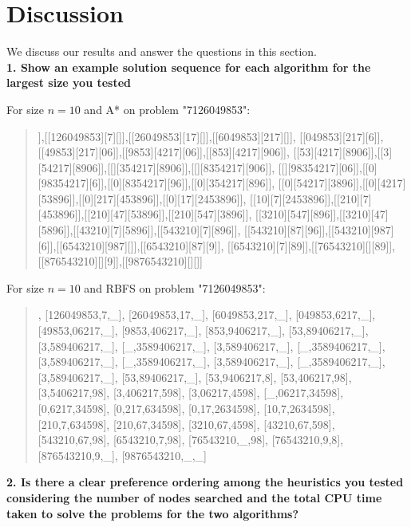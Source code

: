 \section{Discussion}

We discuss our results and answer the questions in this section.\\

\textbf{1. Show an example solution sequence for each algorithm for the largest size you tested}

For size $n = 10$ and A* on problem "7126049853":

\begin{quote}
\noindent
[[7126049853][][]],[[126049853][7][]],[[26049853][17][]],[[6049853][217][]],
[[049853][217][6]],[[49853][217][06]],[[9853][4217][06]],[[853][4217][906]],
[[53][4217][8906]],[[3][54217][8906]],[[][354217][8906]],[[][8354217][906]],
[[][98354217][06]],[[0][98354217][6]],[[0][8354217][96]],[[0][354217][896]],
[[0][54217][3896]],[[0][4217][53896]],[[0][217][453896]],[[0][17][2453896]],
[[10][7][2453896]],[[210][7][453896]],[[210][47][53896]],[[210][547][3896]],
[[3210][547][896]],[[3210][47][5896]],[[43210][7][5896]],[[543210][7][896]],
[[543210][87][96]],[[543210][987][6]],[[6543210][987][]],[[6543210][87][9]],
[[6543210][7][89]],[[76543210][][89]],[[876543210][][9]],[[9876543210][][]]
\end{quote}

For size $n = 10$ and RBFS on problem "7126049853":

\begin{quote}
\noindent
[7126049853,\_,\_], [126049853,7,\_], [26049853,17,\_], [6049853,217,\_], [049853,6217,\_], [49853,06217,\_], [9853,406217,\_], [853,9406217,\_], [53,89406217,\_], [3,589406217,\_], [\_,3589406217,\_], [3,589406217,\_], [\_,3589406217,\_], [3,589406217,\_], [\_,3589406217,\_], [3,589406217,\_], [\_,3589406217,\_], [3,589406217,\_], [53,89406217,\_], [53,9406217,8], [53,406217,98], [3,5406217,98], [3,406217,598], [3,06217,4598], [\_,06217,34598], [0,6217,34598], [0,217,634598], [0,17,2634598], [10,7,2634598], [210,7,634598], [210,67,34598], [3210,67,4598], [43210,67,598], [543210,67,98], [6543210,7,98], [76543210,\_,98], [76543210,9,8], [876543210,9,\_], [9876543210,\_,\_] \\
\end{quote}

\textbf{2. Is there a clear preference ordering among the heuristics you tested considering the number of nodes searched and the total CPU time taken to solve the problems for the two algorithms?}

